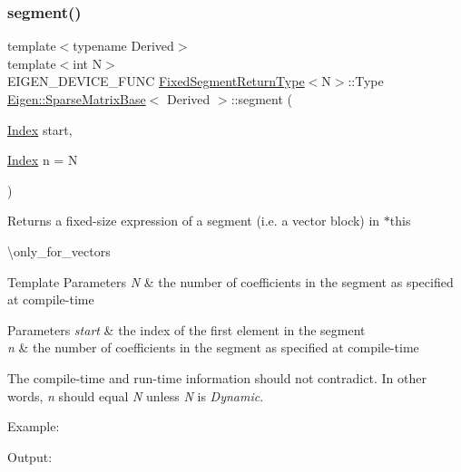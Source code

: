 \subsubsection{\texorpdfstring{segment()}{segment()}\hspace{0.1cm}{\footnotesize\ttfamily [2/2]}}
{\footnotesize\ttfamily template$<$typename Derived$>$ \\
template$<$int N$>$ \\
E\+I\+G\+E\+N\+\_\+\+D\+E\+V\+I\+C\+E\+\_\+\+F\+U\+NC \mbox{\hyperlink{struct_eigen_1_1_sparse_matrix_base_1_1_fixed_segment_return_type}{Fixed\+Segment\+Return\+Type}}$<$N$>$\+::Type \mbox{\hyperlink{class_eigen_1_1_sparse_matrix_base}{Eigen\+::\+Sparse\+Matrix\+Base}}$<$ Derived $>$\+::segment (\begin{DoxyParamCaption}\item[{\mbox{\hyperlink{struct_eigen_1_1_eigen_base_a554f30542cc2316add4b1ea0a492ff02}{Index}}}]{start,  }\item[{\mbox{\hyperlink{struct_eigen_1_1_eigen_base_a554f30542cc2316add4b1ea0a492ff02}{Index}}}]{n = {\ttfamily N} }\end{DoxyParamCaption})\hspace{0.3cm}{\ttfamily [inline]}}

\begin{DoxyReturn}{Returns}
a fixed-\/size expression of a segment (i.\+e. a vector block) in {\ttfamily $\ast$this} 
\end{DoxyReturn}
\textbackslash{}only\+\_\+for\+\_\+vectors


\begin{DoxyTemplParams}{Template Parameters}
{\em N} & the number of coefficients in the segment as specified at compile-\/time \\
\hline
\end{DoxyTemplParams}

\begin{DoxyParams}{Parameters}
{\em start} & the index of the first element in the segment \\
\hline
{\em n} & the number of coefficients in the segment as specified at compile-\/time\\
\hline
\end{DoxyParams}
The compile-\/time and run-\/time information should not contradict. In other words, {\itshape n} should equal {\itshape N} unless {\itshape N} is {\itshape Dynamic}.

Example\+: 
\begin{DoxyCodeInclude}{0}
\end{DoxyCodeInclude}
 Output\+: 
\begin{DoxyVerbInclude}
\end{DoxyVerbInclude}


